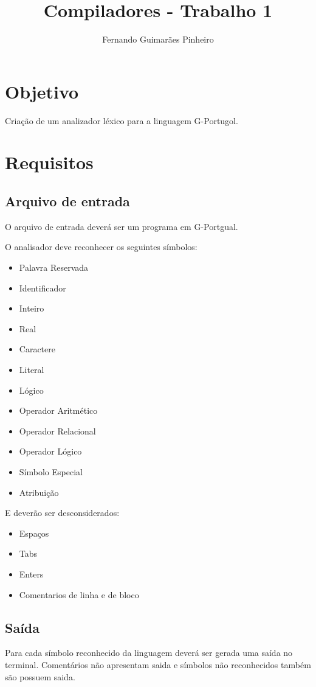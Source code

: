 \documentclass[a4paper,10pt]{article}
\title{Compiladores - Trabalho 1}
\author{Fernando Guimarães Pinheiro}
\begin{document}
\maketitle



\section{Objetivo}
	Criação de um analizador léxico para a linguagem G-Portugol.

\section{Requisitos}

	\subsection{Arquivo de entrada}
		O arquivo de entrada deverá ser um programa em G-Portgual.

		O analisador deve reconhecer os seguintes símbolos:
		\begin{itemize}
		\item Palavra Reservada
		\item Identificador
		\item Inteiro
		\item Real
		\item Caractere
		\item Literal
		\item Lógico
		\item Operador Aritmético
		\item Operador Relacional
		\item Operador Lógico
		\item Símbolo Especial
		\item Atribuição
		\end{itemize}

		E deverão ser desconsiderados:
		\begin{itemize}
		 \item Espaços
		 \item Tabs
		 \item Enters
 		 \item Comentarios de linha e de bloco
		\end{itemize}


	\subsection{Saída}
		Para cada símbolo reconhecido da linguagem deverá ser gerada uma saída no terminal.
		Comentários não apresentam saida e símbolos não reconhecidos também são possuem saida.
\end{document}
